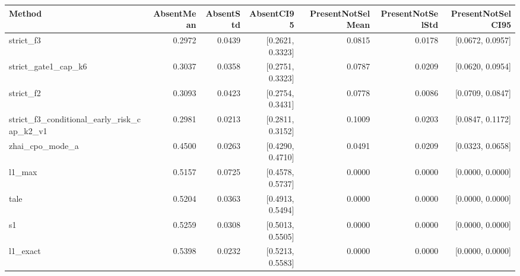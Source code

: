\begin{tabular}{lrrrrrr}
\hline
Method & AbsentMean & AbsentStd & AbsentCI95 & PresentNotSelMean & PresentNotSelStd & PresentNotSelCI95 \\
\hline
strict_f3 & 0.2972 & 0.0439 & [0.2621, 0.3323] & 0.0815 & 0.0178 & [0.0672, 0.0957] \\
strict_gate1_cap_k6 & 0.3037 & 0.0358 & [0.2751, 0.3323] & 0.0787 & 0.0209 & [0.0620, 0.0954] \\
strict_f2 & 0.3093 & 0.0423 & [0.2754, 0.3431] & 0.0778 & 0.0086 & [0.0709, 0.0847] \\
strict_f3_conditional_early_risk_cap_k2_v1 & 0.2981 & 0.0213 & [0.2811, 0.3152] & 0.1009 & 0.0203 & [0.0847, 0.1172] \\
zhai_cpo_mode_a & 0.4500 & 0.0263 & [0.4290, 0.4710] & 0.0491 & 0.0209 & [0.0323, 0.0658] \\
l1_max & 0.5157 & 0.0725 & [0.4578, 0.5737] & 0.0000 & 0.0000 & [0.0000, 0.0000] \\
tale & 0.5204 & 0.0363 & [0.4913, 0.5494] & 0.0000 & 0.0000 & [0.0000, 0.0000] \\
s1 & 0.5259 & 0.0308 & [0.5013, 0.5505] & 0.0000 & 0.0000 & [0.0000, 0.0000] \\
l1_exact & 0.5398 & 0.0232 & [0.5213, 0.5583] & 0.0000 & 0.0000 & [0.0000, 0.0000] \\
\hline
\end{tabular}
